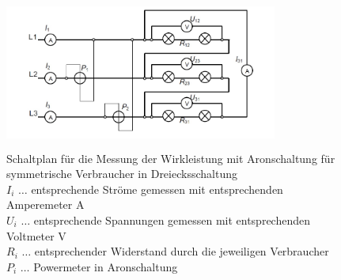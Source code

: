 \documentclass[12pt,english,ngerman]{scrartcl}
\begin{document}
\begin{figure}[H]
	\begin{center}
		\includegraphics[width = 0.8\textwidth, height=5cm]{./figures/aufbau1.png}
	\end{center}
	\caption[Schaltplan für die Messung der Wirkleistung mit Aronschaltung für symmetrische
		Verbraucher in Dreiecksschaltung] {Schaltplan für die Messung der Wirkleistung
		mit Aronschaltung für symmetrische Verbraucher in
		Dreiecksschaltung~\cite[]{herbert_leistungsmessung_nodate}                       \\
		$I_i$ \(\dots\) entsprechende Ströme gemessen mit entsprechenden Amperemeter A   \\
		$U_i$ \(\dots\) entsprechende Spannungen gemessen mit entsprechenden Voltmeter V \\
		$R_i$ \(\dots\) entsprechender Widerstand durch die jeweiligen Verbraucher       \\
		$P_i$ \(\dots\) Powermeter in Aronschaltung
	}\label{fig:aufbau1}
\end{figure}
\end{document}
